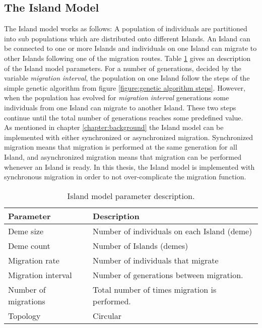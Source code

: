 \subsection{The Island Model}


\noindent The Island model works as follows: A population of individuals are partitioned into sub populations which are distributed onto different Islands. An Island can be connected to one or more Islands and individuals on one Island can migrate to other Islands following one of the migration routes. Table \ref{table:parameter description island model} gives an description of the Island model parameters. For a number of generations, decided by the variable \textit{migration interval}, the population on one Island follow the steps of the simple genetic algorithm from figure \ref{figure:genetic algorithm steps}. However, when the population has evolved for \textit{migration interval} generations some individuals from one Island can migrate to another Island. These two steps continue until the total number of generations reaches some predefined value.\\


\noindent As mentioned in chapter \ref{chapter:background} the Island model can be implemented with either synchronized or asynchronized migration. Synchronized migration means that migration is performed at the same generation for all Island, and asynchronized migration means that migration can be performed whenever an Island is ready. In this thesis, the Island model is implemented with synchronous migration in order to not over-complicate the migration function.\\


\begin{table}[h!]
    \centering
    \caption{Island model parameter description.}
    \label{table:parameter description island model}
        \begin{tabular}{l|l}
         \textbf{Parameter} & \textbf{Description}  \\
         \hline
         Deme size  & Number of individuals on each Island (deme) \\
         Deme count & Number of Islands (demes) \\
         Migration rate & Number of individuals that migrate \\
         Migration interval & Number of generations between migration. \\
         Number of migrations & Total number of times migration is performed. \\
         Topology & Circular
    \end{tabular}
\end{table}


